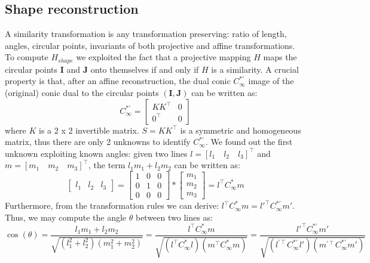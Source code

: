 \documentclass[11pt, oneside]{article}
\begin{document}
\begin{figure}[!h]
\begin{minipage}{.55\textwidth}
		\label{image_affine_reconstruction}
	\end{minipage}
\end{figure}
\pagebreak

\subsection{Shape reconstruction}
A similarity transformation is any transformation preserving: ratio of length, angles, circular points, invariants of both projective and affine transformations. To compute $H_{shape}$ we exploited the fact that a projective mapping $H$ maps the circular points $\textbf{I}$ and $\textbf{J}$ onto themselves if and only if $H$ is  a similarity. A crucial property is that, after an affine reconstruction, the dual conic $C^{*'}_\infty$ image of the (original) conic dual to the circular points $(\textbf{I},\textbf{J})$ can be written as:
\begin{equation}
	C^{*'}_\infty = 
	\begin{bmatrix}
		KK^\intercal  & 0 \\ 0^\intercal & 0
	\end{bmatrix}
\end{equation}
where $K$ is a 2 x 2 invertible matrix. $S = KK^\intercal$ is a symmetric and homogeneous matrix, thus there are only 2 unknowns to identify $C^{*'}_\infty$. We found out the first unknown exploiting known angles: given two lines $l = [l_1\quad l_2 \quad l_3]^\intercal$ and $m = [m_1\quad m_2 \quad m_3]^\intercal$, the term $l_1 m_1 + l_2 m_2$ can be written as:
\begin{equation}
	\begin{bmatrix}
		l_1 & l_2 & l_3
	\end{bmatrix}
	=
	\begin{bmatrix}
		1 & 0 & 0 \\ 0 & 1 & 0 \\ 0 & 0 & 0
	\end{bmatrix} *
	\begin{bmatrix}
		m_1 \\ m_2 \\ m_3
	\end{bmatrix}
	= l^\intercal C^{*}_\infty m
\end{equation}
Furthermore, from the transformation rules we can derive: $l^\intercal C^{*}_\infty m = l{'^\intercal} C^{*'}_\infty m'$. Thus, we may compute the angle $\theta$ between two lines as:
\begin{equation}
	\label{eqn:angle}
	\cos(\theta) = \frac{l_1 m_1 + l_2  m_2}{\sqrt{(l_1^2 + l_2^2)(m_1^2 + m_2 ^2)}}
	=
	\frac{l^\intercal C^{*}_\infty m}{\sqrt{(l^\intercal C^{*}_\infty l)(m^\intercal C^{*}_\infty m)}} 
	= 
	\frac{l{'^\intercal} C^{*'}_\infty m'}{\sqrt{(l^{'\intercal} C^{*'}_\infty l')(m^{'\intercal} C^{*'}_\infty m')}}
\end{equation}
\end{document}
